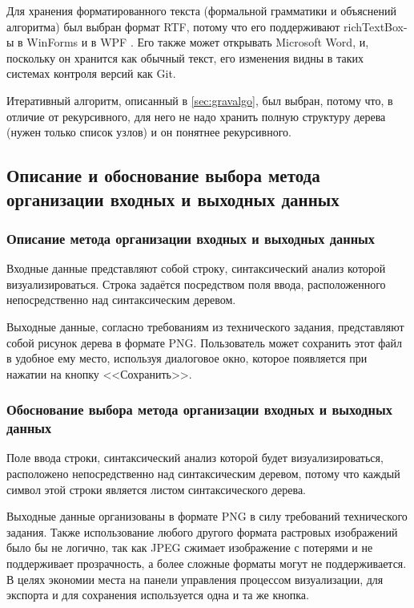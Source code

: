 \documentclass[a4paper,12pt]{article}
\begin{document}
  Для хранения форматированного текста (формальной грамматики и объяснений алгоритма)
  был выбран формат RTF, потому что его поддерживают richTextBox-ы в WinForms и в WPF \cite{wpf}.
  Его также может открывать Microsoft Word, и, поскольку он хранится как обычный текст,
  его изменения видны в таких системах контроля версий как Git.

  Итеративный алгоритм, описанный в \autoref{sec:gravalgo}, был выбран, потому что, в отличие от рекурсивного,
  для него не надо хранить полную структуру дерева (нужен только список узлов) и он понятнее рекурсивного.

  \subsection{Описание и обоснование выбора метода организации входных и выходных данных}
  \subsubsection{Описание метода организации входных и выходных данных}
  Входные данные представляют собой строку, синтаксический анализ которой визуализироваться.
  Строка задаётся посредством поля ввода, расположенного непосредственно над синтаксическим деревом.

  Выходные данные, согласно требованиям из технического задания, представляют собой рисунок дерева в формате PNG.
  Пользователь может сохранить этот файл в удобное ему место, используя диалоговое окно,
  которое появляется при нажатии на кнопку <<Сохранить>>.

  \subsubsection{Обоснование выбора метода организации входных и выходных данных}
  Поле ввода строки, синтаксический анализ которой будет визуализироваться, расположено непосредственно над синтаксическим деревом,
  потому что каждый символ этой строки является листом синтаксического дерева.

  Выходные данные организованы в формате PNG в силу требований технического задания.
  Также использование любого другого формата растровых изображений было бы не логично,
  так как JPEG сжимает изображение с потерями и не поддерживает прозрачность, а более сложные форматы могут не поддерживается.
  В целях экономии места на панели управления процессом визуализации,
  для экспорта и для сохранения используется одна и та же кнопка.
\end{document}
